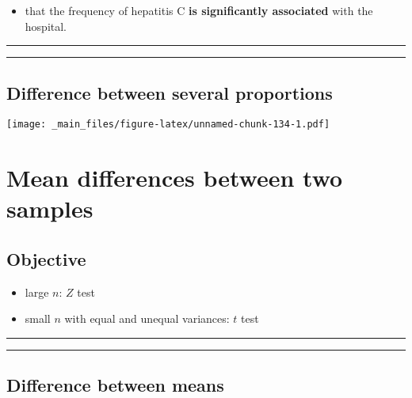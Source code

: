 \documentclass[
]{book}
\providecommand{\tightlist}{%
  \setlength{\itemsep}{0pt}\setlength{\parskip}{0pt}}
\begin{document}
\begin{itemize}
\tightlist
\item
  that the frequency of hepatitis C \textbf{is significantly associated} with the hospital.
\end{itemize}

\begin{center}\rule{0.5\linewidth}{0.5pt}\end{center}

\begin{center}\rule{0.5\linewidth}{0.5pt}\end{center}

\hypertarget{difference-between-several-proportions-3}{%
\section{Difference between several proportions}\label{difference-between-several-proportions-3}}

\texttt{[image: \_main\_files/figure-latex/unnamed-chunk-134-1.pdf]}

\hypertarget{mean-differences-between-two-samples}{%
\chapter{Mean differences between two samples}\label{mean-differences-between-two-samples}}

\hypertarget{objective-15}{%
\section{Objective}\label{objective-15}}

\begin{itemize}
\tightlist
\item
  large \(n\): \(Z\) test
\item
  small \(n\) with equal and unequal variances: \(t\) test
\end{itemize}

\begin{center}\rule{0.5\linewidth}{0.5pt}\end{center}

\begin{center}\rule{0.5\linewidth}{0.5pt}\end{center}

\hypertarget{difference-between-means}{%
\section{Difference between means}\label{difference-between-means}}
\end{document}
